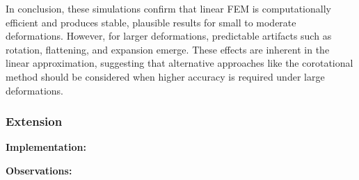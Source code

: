 \documentclass[11pt,a4paper]{article}
\begin{document}
In conclusion, these simulations confirm that linear FEM is computationally efficient and produces stable, plausible results for small to moderate deformations. However, for larger deformations, predictable artifacts such as rotation, flattening, and expansion emerge. These effects are inherent in the linear approximation, suggesting that alternative approaches like the corotational method should be considered when higher accuracy is required under large deformations.



\subsubsection*{Extension}

\noindent \hspace{20pt} \textbf{Implementation:}

\noindent \hspace{20pt} \noindent \textbf{Observations:}
\end{document}
